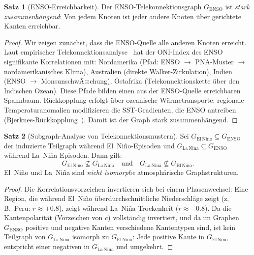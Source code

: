 ﻿\documentclass[a4paper,12pt]{article}
\theoremstyle{definition}
\newtheorem{satz}{Satz}
\begin{document}
\begin{satz}[ENSO-Erreichbarkeit]
\label{satz:enso_reach}
Der ENSO-Telekonnektionsgraph $G_{\mathrm{ENSO}}$ ist \emph{stark zusammenh\"angend}:
Von jedem Knoten ist jeder andere Knoten \"uber gerichtete Kanten erreichbar.
\end{satz}

\begin{proof}
Wir zeigen zun\"achst, dass die ENSO-Quelle alle anderen Knoten erreicht.
Laut empirischer Telekonnektionsanalyse~\cite{trenberth1998} hat der ONI-Index
des ENSO signifikante Korrelationen mit:
Nordamerika (Pfad: ENSO $\to$ PNA-Muster $\to$ nordamerikanisches Klima),
Australien (direkte Walker-Zirkulation),
Indien (ENSO $\to$ MonsunschwÃ¤chung),
\"Ostafrika (Telekonnektionskette \"uber den Indischen Ozean).
Diese Pfade bilden einen aus der ENSO-Quelle erreichbaren Spannbaum.
R\"uckkopplung erfolgt \"uber ozeanische W\"armetransporte: regionale
Temperaturanomalien modifizieren die SST-Gradienten, die ENSO antreiben
(Bjerknes-R\"uckkopplung~\cite{bjerknes1969}).
Damit ist der Graph stark zusammenh\"angend.
\end{proof}

\begin{satz}[Subgraph-Analyse von Telekonnektionsmustern]
\label{satz:tele_subgraph}
Sei $G_{\mathrm{El\,Nino}} \subseteq G_{\mathrm{ENSO}}$ der induzierte Teilgraph
w\"ahrend El~Ni\~no-Episoden und $G_{\mathrm{La\,Nina}} \subseteq G_{\mathrm{ENSO}}$
w\"ahrend La~Ni\~na-Episoden. Dann gilt:
\[
G_{\mathrm{El\,Nino}} \not\subseteq G_{\mathrm{La\,Nina}} \quad \text{und} \quad
G_{\mathrm{La\,Nina}} \not\subseteq G_{\mathrm{El\,Nino}}.
\]
El~Ni\~no und La~Ni\~na sind \emph{nicht isomorphe} atmosph\"arische Graphstrukturen.
\end{satz}

\begin{proof}
Die Korrelationsvorzeichen invertieren sich bei einem Phasenwechsel: Eine Region,
die w\"ahrend El~Ni\~no \"uberdurchschnittliche Niederschl\"age zeigt
(z.\,B.\ Peru: $r \approx +0.8$), zeigt w\"ahrend La~Ni\~na Trockenheit
($r \approx -0.8$). Da die Kantenpolarit\"at (Vorzeichen von $c$) vollst\"andig
invertiert, und da im Graphen $G_{\mathrm{ENSO}}$ positive und negative Kanten
verschiedene Kantentypen sind, ist kein Teilgraph von $G_{\mathrm{La\,Nina}}$
isomorph zu $G_{\mathrm{El\,Nino}}$: Jede positive Kante in $G_{\mathrm{El\,Nino}}$
entspricht einer negativen in $G_{\mathrm{La\,Nina}}$ und umgekehrt.
\end{proof}
\end{document}
